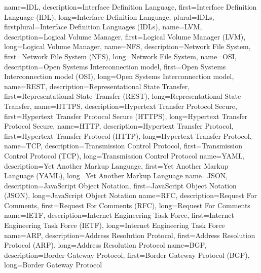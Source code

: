 {%
    name={IDL},
    description={Interface Definition Language},
    first={Interface Definition Language (IDL)},
    long={Interface Definition Language},
    plural={IDLs},
    firstplural={Interface Definition Languages (IDLs)},
}
{%
    name={LVM},
    description={Logical Volume Manager},
    first={Logical Volume Manager (LVM)},
    long={Logical Volume Manager},
}
{%
    name={NFS},
    description={Network File System},
    first={Network File System (NFS)},
    long={Network File System},
}
{%
    name={OSI},
    description={Open Systems Interconnection model},
    first={Open Systems Interconnection model (OSI)},
    long={Open Systems Interconnection model},
}
{%
    name={REST},
    description={Representational State Transfer},
    first={Representational State Transfer (REST)},
    long={Representational State Transfer},
}
{%
    name={HTTPS},
    description={Hypertext Transfer Protocol Secure},
    first={Hypertext Transfer Protocol Secure (HTTPS)},
    long={Hypertext Transfer Protocol Secure},
}
{%
    name={HTTP},
    description={Hypertext Transfer Protocol},
    first={Hypertext Transfer Protocol (HTTP)},
    long={Hypertext Transfer Protocol},
}
{%
    name={TCP},
    description={Transmission Control Protocol},
    first={Transmission Control Protocol (TCP)},
    long={Transmission Control Protocol}
}
{%
    name={YAML},
    description={Yet Another Markup Language},
    first={Yet Another Markup Language (YAML)},
    long={Yet Another Markup Language}
}
{%
    name={JSON},
    description={JavaScript Object Notation},
    first={JavaScript Object Notation (JSON)},
    long={JavaScript Object Notation}
}
{%
    name={RFC},
    description={Request For Comments},
    first={Request For Comments (RFC)},
    long={Request For Comments}
}
{%
    name={IETF},
    description={Internet Engineering Task Force},
    first={Internet Engineering Task Force (IETF)},
    long={Internet Engineering Task Force}
}
{%
    name={ARP},
    description={Address Resolution Protocol},
    first={Address Resolution Protocol (ARP)},
    long={Address Resolution Protocol}
}
{%
    name={BGP},
    description={Border Gateway Protocol},
    first={Border Gateway Protocol (BGP)},
    long={Border Gateway Protocol}
}
